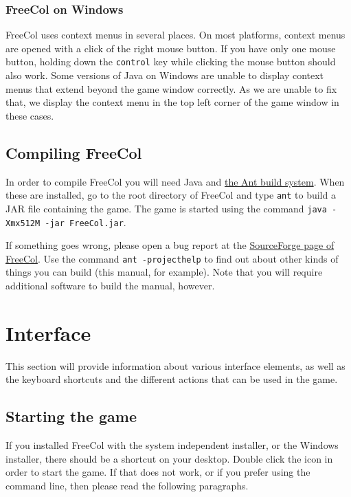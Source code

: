 \documentclass[12pt]{book}
\begin{document}
\hypertarget{FreeCol on Windows}{\subsection{FreeCol on Windows}}

FreeCol uses context menus in several places. On most platforms,
context menus are opened with a click of the right mouse button. If
you have only one mouse button, holding down the \texttt{control} key
while clicking the mouse button should also work. Some versions of
Java on Windows are unable to display context menus that extend beyond
the game window correctly. As we are unable to fix that, we display
the context menu in the top left corner of the game window in these
cases.


\hypertarget{Compiling FreeCol}{\section{Compiling FreeCol}}

In order to compile FreeCol you will need Java and
\href{http://ant.apache.org/}{the Ant build system}. When these are
installed, go to the root directory of FreeCol and type \verb$ant$ to
build a JAR file containing the game. The game is started using the
command \verb$java -Xmx512M -jar FreeCol.jar$.

If something goes wrong, please open a bug report at the
\href{http://sourceforge.net/projects/freecol}{SourceForge page of
  FreeCol}. Use the command \verb$ant -projecthelp$ to find out
about other kinds of things you can build (this manual, for
example). Note that you will require additional software to build the
manual, however.


\hypertarget{Interface}{\chapter{Interface}}

This section will provide information about various interface
elements, as well as the keyboard shortcuts and the different actions
that can be used in the game.

\hypertarget{Starting the game}{\section{Starting the game}}

If you installed FreeCol with the system independent installer, or the
Windows installer, there should be a shortcut on your desktop. Double
click the icon in order to start the game. If that does not work, or
if you prefer using the command line, then please read the following
paragraphs.
\end{document}
